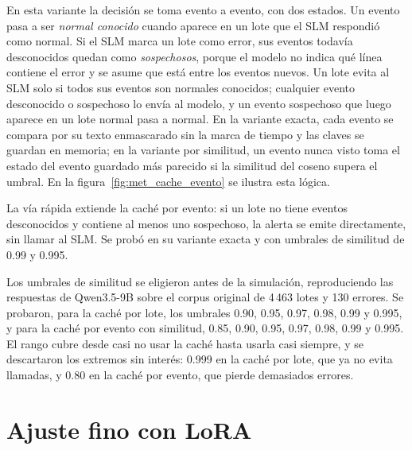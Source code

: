 En esta variante la decisión se toma evento a evento, con dos estados. Un evento pasa a ser \emph{normal conocido} cuando aparece en un lote que el SLM respondió como normal. Si el SLM marca un lote como error, sus eventos todavía desconocidos quedan como \emph{sospechosos}, porque el modelo no indica qué línea contiene el error y se asume que está entre los eventos nuevos. Un lote evita al SLM solo si todos sus eventos son normales conocidos; cualquier evento desconocido o sospechoso lo envía al modelo, y un evento sospechoso que luego aparece en un lote normal pasa a normal. En la variante exacta, cada evento se compara por su texto enmascarado sin la marca de tiempo y las claves se guardan en memoria; en la variante por similitud, un evento nunca visto toma el estado del evento guardado más parecido si la similitud del coseno supera el umbral. En la figura~\ref{fig:met_cache_evento} se ilustra esta lógica.



La vía rápida extiende la caché por evento: si un lote no tiene eventos desconocidos y contiene al menos uno sospechoso, la alerta se emite directamente, sin llamar al SLM. Se probó en su variante exacta y con umbrales de similitud de 0.99 y 0.995.


Los umbrales de similitud se eligieron antes de la simulación, reproduciendo las respuestas de Qwen3.5-9B sobre el corpus original de 4\,463 lotes y 130 errores. Se probaron, para la caché por lote, los umbrales 0.90, 0.95, 0.97, 0.98, 0.99 y 0.995, y para la caché por evento con similitud, 0.85, 0.90, 0.95, 0.97, 0.98, 0.99 y 0.995. El rango cubre desde casi no usar la caché hasta usarla casi siempre, y se descartaron los extremos sin interés: 0.999 en la caché por lote, que ya no evita llamadas, y 0.80 en la caché por evento, que pierde demasiados errores.

\section{Ajuste fino con LoRA}\label{sec:met_finetuning}

